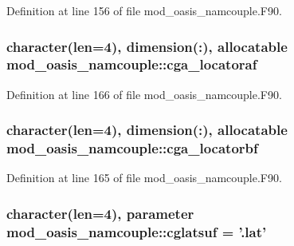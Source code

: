 Definition at line 156 of file mod\+\_\+oasis\+\_\+namcouple.\+F90.

\hypertarget{classmod__oasis__namcouple_a6f4080d45f0b9be5a0466967f535b83b}{
\subsubsection[{cga\+\_\+locatoraf}]{\setlength{\rightskip}{0pt plus 5cm}character(len=4), dimension(\+:), allocatable mod\+\_\+oasis\+\_\+namcouple\+::cga\+\_\+locatoraf\hspace{0.3cm}{\ttfamily [private]}}}\label{classmod__oasis__namcouple_a6f4080d45f0b9be5a0466967f535b83b}


Definition at line 166 of file mod\+\_\+oasis\+\_\+namcouple.\+F90.

\hypertarget{classmod__oasis__namcouple_ac22155599e9b49d57514dd1f7dc9928a}{
\subsubsection[{cga\+\_\+locatorbf}]{\setlength{\rightskip}{0pt plus 5cm}character(len=4), dimension(\+:), allocatable mod\+\_\+oasis\+\_\+namcouple\+::cga\+\_\+locatorbf\hspace{0.3cm}{\ttfamily [private]}}}\label{classmod__oasis__namcouple_ac22155599e9b49d57514dd1f7dc9928a}


Definition at line 165 of file mod\+\_\+oasis\+\_\+namcouple.\+F90.

\hypertarget{classmod__oasis__namcouple_a2036218f05c62fc672bd07ece34f26db}{
\subsubsection[{cglatsuf}]{\setlength{\rightskip}{0pt plus 5cm}character(len=4), parameter mod\+\_\+oasis\+\_\+namcouple\+::cglatsuf = '.lat'\hspace{0.3cm}{\ttfamily [private]}}}\label{classmod__oasis__namcouple_a2036218f05c62fc672bd07ece34f26db}


